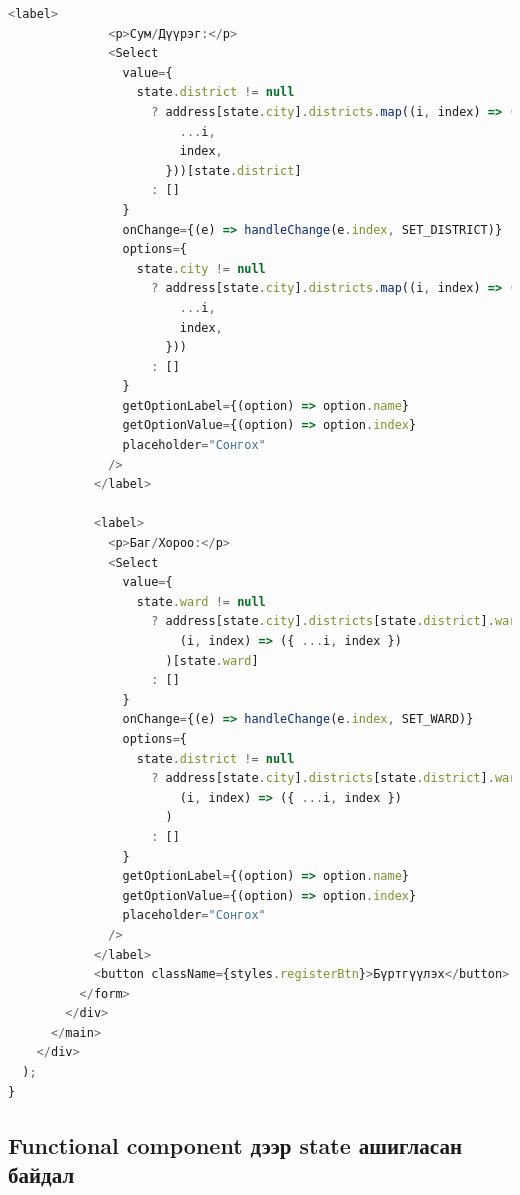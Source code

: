 \begin{lstlisting}[language=Javascript, frame=single]
            <label>
              <p>Сум/Дүүрэг:</p>
              <Select
                value={
                  state.district != null
                    ? address[state.city].districts.map((i, index) => ({
                        ...i,
                        index,
                      }))[state.district]
                    : []
                }
                onChange={(e) => handleChange(e.index, SET_DISTRICT)}
                options={
                  state.city != null
                    ? address[state.city].districts.map((i, index) => ({
                        ...i,
                        index,
                      }))
                    : []
                }
                getOptionLabel={(option) => option.name}
                getOptionValue={(option) => option.index}
                placeholder="Сонгох"
              />
            </label>

            <label>
              <p>Баг/Хороо:</p>
              <Select
                value={
                  state.ward != null
                    ? address[state.city].districts[state.district].wards.map(
                        (i, index) => ({ ...i, index })
                      )[state.ward]
                    : []
                }
                onChange={(e) => handleChange(e.index, SET_WARD)}
                options={
                  state.district != null
                    ? address[state.city].districts[state.district].wards.map(
                        (i, index) => ({ ...i, index })
                      )
                    : []
                }
                getOptionLabel={(option) => option.name}
                getOptionValue={(option) => option.index}
                placeholder="Сонгох"
              />
            </label>
            <button className={styles.registerBtn}>Бүртгүүлэх</button>
          </form>
        </div>
      </main>
    </div>
  );
}
\end{lstlisting}

\subsection{Functional component дээр state ашигласан байдал}

